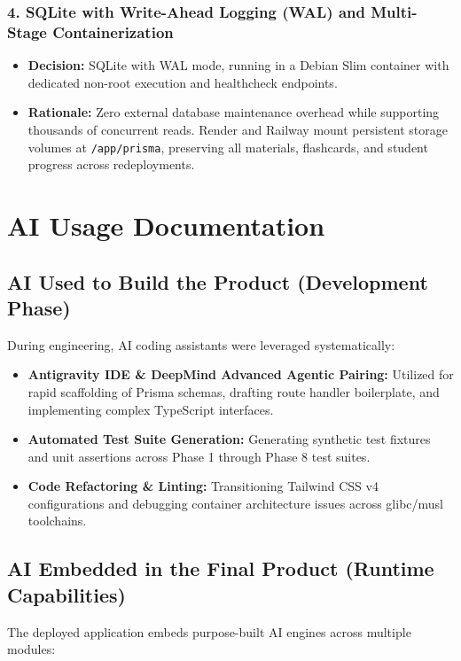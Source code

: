 \documentclass[11pt,a4paper]{article}
\begin{document}
\subsubsection{4. SQLite with Write-Ahead Logging (WAL) and Multi-Stage Containerization}
\begin{itemize}[noitemsep]
    \item \textbf{Decision:} SQLite with WAL mode, running in a Debian Slim container with dedicated non-root execution and healthcheck endpoints.
    \item \textbf{Rationale:} Zero external database maintenance overhead while supporting thousands of concurrent reads. Render and Railway mount persistent storage volumes at \texttt{/app/prisma}, preserving all materials, flashcards, and student progress across redeployments.
\end{itemize}

\section{AI Usage Documentation}

\subsection{AI Used to Build the Product (Development Phase)}
During engineering, AI coding assistants were leveraged systematically:
\begin{itemize}[noitemsep]
    \item \textbf{Antigravity IDE \& DeepMind Advanced Agentic Pairing:} Utilized for rapid scaffolding of Prisma schemas, drafting route handler boilerplate, and implementing complex TypeScript interfaces.
    \item \textbf{Automated Test Suite Generation:} Generating synthetic test fixtures and unit assertions across Phase 1 through Phase 8 test suites.
    \item \textbf{Code Refactoring \& Linting:} Transitioning Tailwind CSS v4 configurations and debugging container architecture issues across glibc/musl toolchains.
\end{itemize}

\subsection{AI Embedded in the Final Product (Runtime Capabilities)}
The deployed application embeds purpose-built AI engines across multiple modules:
\end{document}

